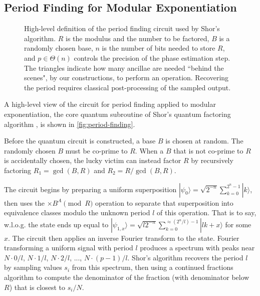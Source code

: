 \documentclass[twocolumn,longbibliography]{quantumarticle-customized}
\begin{document}
\subsection{Period Finding for Modular Exponentiation}

\begin{figure}
  \centering
  \caption{
	High-level definition of the period finding circuit \cite{Shor1999} used by Shor's algorithm.
	$R$ is the modulus and the number to be factored, $B$ is a randomly chosen base, $n$ is the number of bits needed to store $R$, and $p \in \Theta(n)$ controls the precision of the phase estimation step.
    The triangles indicate how many ancillae are needed ``behind the scenes", by our constructions, to perform an operation.
	Recovering the period requires classical post-processing of the sampled output.
  }
  \label{fig:period-finding}
\end{figure}

A high-level view of the circuit for period finding applied to modular exponentiation, the core quantum subroutine of Shor's quantum factoring algorithm \cite{Shor1999}, is shown in \autoref{fig:period-finding}.

Before the quantum circuit is constructed, a base $B$ is chosen at random.
The randomly chosen $B$ must be co-prime to $R$.
When a $B$ that is not co-prime to $R$ is accidentally chosen, the lucky victim can instead factor $R$ by recursively factoring $R_1 = \gcd(B, R)$ and $R_2 = R / \gcd(B, R)$.

The circuit begins by preparing a uniform superposition $|\psi_0\rangle = \sqrt{2^{-n}} \sum_{k=0}^{2^n-1} |k\rangle$, then uses the $\times B^A {\pmod R}$ operation to separate that superposition into equivalence classes modulo the unknown period $l$ of this operation.
That is to say, w.l.o.g. the state ends up equal to $|\psi_{1,x}\rangle = \sqrt{l 2^{-n}} \sum_{k=0}^{\approx (2^n/l)-1} |l k + x \rangle$ for some $x$.
The circuit then applies an inverse Fourier transform to the state.
Fourier transforming a uniform signal with period $l$ produces a spectrum with peaks near $N \cdot 0/l$, $N \cdot 1/l$, $N \cdot 2/l$, ..., $N \cdot (p-1)/l$.
Shor's algorithm recovers the period $l$ by sampling values $s_i$ from this spectrum, then using a continued fractions algorithm to compute the denominator of the fraction (with denominator below $R$) that is closest to $s_i/N$.
\end{document}
